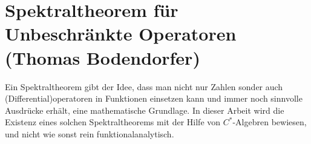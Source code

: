 \section{Spektraltheorem f\"ur Unbeschr\"ankte Operatoren
(Thomas Bodendorfer)}

Ein Spektraltheorem gibt der Idee, dass man nicht nur Zahlen sonder auch
(Differential)operatoren in Funktionen einsetzen kann und immer noch sinnvolle
Ausdrücke erhält, eine mathematische Grundlage. In dieser Arbeit wird die
Existenz eines solchen Spektraltheorems mit der Hilfe von $C^*$-Algebren
bewiesen, und nicht wie sonst rein funktionalanalytisch.
